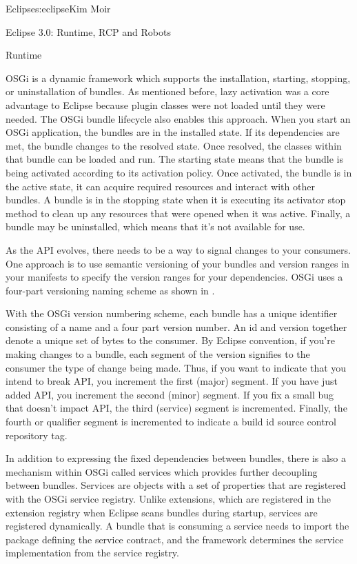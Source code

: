 \begin{aosachapter}{Eclipse}{s:eclipse}{Kim Moir}
\begin{aosasect1}{Eclipse 3.0: Runtime, RCP and Robots}
\begin{aosasect2}{Runtime}

OSGi is a dynamic framework which supports the installation, starting,
stopping, or uninstallation of bundles. As mentioned before, lazy
activation was a core advantage to Eclipse because plugin classes were
not loaded until they were needed. The OSGi bundle lifecycle also
enables this approach.  When you start an OSGi application, the
bundles are in the installed state. If its dependencies are met, the
bundle changes to the resolved state.  Once resolved, the classes
within that bundle can be loaded and run.  The starting state means
that the bundle is being activated according to its activation
policy. Once activated, the bundle is in the active state, it can
acquire required resources and interact with other bundles. A bundle
is in the stopping state when it is executing its activator stop method
to clean up any resources that were opened when it was active.
Finally, a bundle may be uninstalled, which means that it's not
available for use.

As the API evolves, there needs to be a way to signal changes to your
consumers. One approach is to use semantic versioning of your bundles
and version ranges in your manifests to specify the version ranges for
your dependencies.  OSGi uses a four-part versioning naming scheme as
shown in .


With the OSGi version numbering scheme, each bundle has a unique
identifier consisting of a name and a four part version number. An id
and version together denote a unique set of bytes to the
consumer. By Eclipse convention, if you're making changes to a bundle,
each segment of the version signifies to the consumer the type of
change being made. Thus, if you want to indicate that you intend to
break API, you increment the first (major) segment.  If you have just
added API, you increment the second (minor) segment. If you fix a
small bug that doesn't impact API, the third (service) segment is
incremented. Finally, the fourth or qualifier segment is incremented
to indicate a build id source control repository tag.

In addition to expressing the fixed dependencies between bundles,
there is also a mechanism within OSGi called services which provides
further decoupling between bundles. Services are objects with a set of
properties that are registered with the OSGi service registry. Unlike
extensions, which are registered in the extension registry when Eclipse
scans bundles during startup, services are registered
dynamically. A bundle that is consuming a service needs to import the
package defining the service contract, and the framework determines
the service implementation from the service registry.


\end{aosasect2}
\end{aosasect1}
\end{aosachapter}
